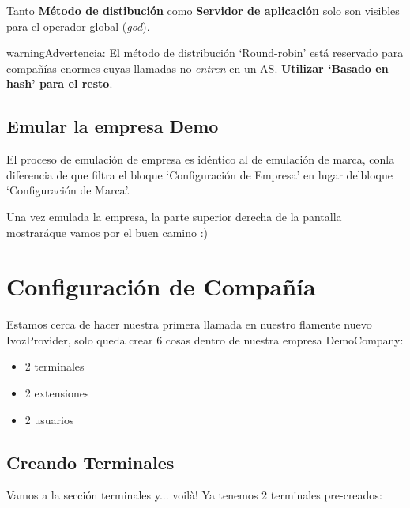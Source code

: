 \documentclass[letterpaper,10pt,spanish]{sphinxmanual}
\begin{document}
Tanto \textbf{Método de distibución} como \textbf{Servidor de aplicación} solo son visibles para el operador global (\emph{god}).

\begin{notice}{warning}{Advertencia:}
El método de distribución `Round-robin' está reservado para compañías enormes cuyas llamadas no \emph{entren} en un AS. \textbf{Utilizar `Basado en hash' para el resto}.
\end{notice}


\subsection{Emular la empresa Demo}
\label{internal_calls/brand_portal:emulate-company}\label{internal_calls/brand_portal:emulate-demo-company}
El proceso de emulación de empresa es idéntico al de emulación de marca, conla diferencia de que filtra el bloque `Configuración de Empresa' en lugar delbloque `Configuración de Marca'.



Una vez emulada la empresa, la parte superior derecha de la pantalla mostraráque vamos por el buen camino :)


\section{Configuración de Compañía}
\label{internal_calls/company_portal:company-configuration}\label{internal_calls/company_portal::doc}
Estamos cerca de hacer nuestra primera llamada en nuestro flamente nuevo IvozProvider, solo queda crear 6 cosas dentro de nuestra empresa DemoCompany:
\begin{itemize}
\item {} 
2 terminales

\item {} 
2 extensiones

\item {} 
2 usuarios

\end{itemize}


\subsection{Creando Terminales}
\label{internal_calls/company_portal:creating-terminals}
Vamos a la sección terminales y... voilà! Ya tenemos 2 terminales pre-creados:
\end{document}
